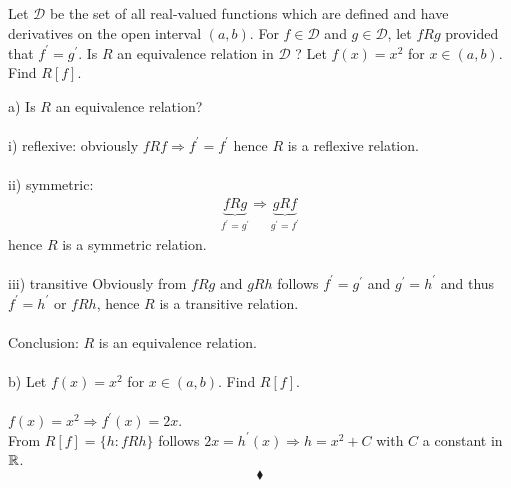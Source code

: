 \subsection{}
\begin{tcolorbox}
Let $\mathscr{D}$ be the set of all real-valued functions which are defined and have derivatives on the open interval $(a, b)$. For $f\in \mathscr{D}$  and $g \in \mathscr{D}$, let $f R g$ provided that $f^{'} = g^{'}$. Is $R$ an equivalence relation in $\mathscr{D}$ ? Let $f(x) = x^2$ for $x \in (a, b)$. Find $R[f]$. 
\end{tcolorbox}
$$ $$
a) Is $R$ an equivalence relation?\\\\
i) reflexive: obviously $fRf\Rightarrow f^{'}=f^{'}$ hence $ R$ is a reflexive relation.\\\\
ii) symmetric: 
\begin{align*}
\underbrace{f R g}_{f^{'}=g^{'}} \Rightarrow \underbrace{g R f}_{g^{'}=f^{'}}
\end{align*}
hence $R$ is a symmetric relation.\\\\
iii) transitive
Obviously from $fRg$ and $gRh$ follows $f^{'}=g^{'}$ and $g^{'}=h^{'}$ and thus $f^{'}=h^{'}$ or $fRh$, 
hence $R$ is a transitive relation.\\\\
Conclusion: $R$ is an equivalence relation.\\\\
b) Let $f(x) = x^2$ for $x \in (a, b)$. Find $R[f]$.\\\\
$f(x) = x^2\Rightarrow f^{'}(x)= 2x$.\\
From $R[f]= \{h: fRh\}$ follows $2x=h^{'}(x)\Rightarrow h= x^2+C$ with $C$ a constant in $\mathbb{R}$.
$$\blacklozenge$$


\newpage
\setcounter{section}{22}
